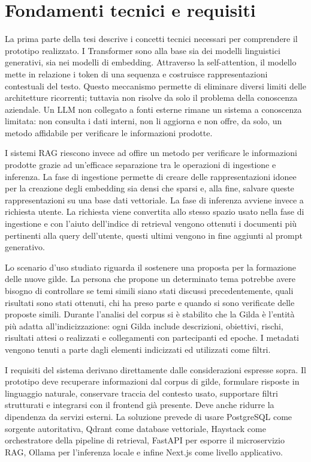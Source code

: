 \documentclass[12pt,a4paper]{article}
\begin{document}
\section*{Fondamenti tecnici e requisiti}

La prima parte della tesi descrive i concetti tecnici necessari per comprendere il
prototipo realizzato. I Transformer sono alla base sia dei modelli linguistici generativi,
sia nei modelli di embedding. Attraverso la self-attention, il modello mette in
relazione i token di una sequenza e costruisce rappresentazioni contestuali del
testo. Questo meccanismo permette di eliminare diversi limiti delle architetture ricorrenti;
tuttavia non risolve da solo il problema della conoscenza aziendale. Un LLM non
collegato a fonti esterne rimane un sistema a conoscenza limitata: non consulta i
dati interni, non li aggiorna e non offre, da solo, un metodo affidabile per verificare le informazioni prodotte.

I sistemi RAG riescono invece ad offire un metodo per verificare le informazioni prodotte
grazie ad un'efficace separazione tra le operazioni di ingestione e inferenza. 
La fase di ingestione permette di creare delle rappresentazioni idonee per la creazione 
degli embedding sia densi che sparsi e, alla fine, salvare queste rappresentazioni su una base 
dati vettoriale.
La fase di inferenza avviene invece a richiesta utente. La richiesta 
viene convertita allo stesso spazio usato nella fase di ingestione e con l'aiuto dell'indice di 
retrieval vengono ottenuti i documenti più pertinenti alla query dell'utente, questi ultimi vengono 
in fine aggiunti al prompt generativo.

Lo scenario d'uso studiato riguarda il sostenere una proposta per la formazione delle nuove gilde. 
La persona che propone un determinato tema potrebbe avere bisogno di controllare se temi simili 
siano stati discussi precedentemente, quali risultati sono stati ottenuti, chi ha preso parte e quando 
si sono verificate delle proposte simili. Durante l'analisi del corpus si è stabilito che la Gilda è 
l'entità più adatta all'indicizzazione: ogni Gilda include descrizioni, obiettivi, rischi, risultati 
attesi o realizzati e collegamenti con partecipanti ed epoche. I metadati vengono tenuti a parte dagli 
elementi indicizzati ed utilizzati come filtri.

I requisiti del sistema derivano direttamente dalle considerazioni espresse sopra. Il prototipo deve
recuperare informazioni dal corpus di gilde, formulare risposte in linguaggio
naturale, conservare traccia del contesto usato, supportare filtri strutturati
e integrarsi con il frontend già presente. Deve anche ridurre la
dipendenza da servizi esterni. La soluzione prevede di usare PostgreSQL come sorgente
autoritativa, Qdrant come database vettoriale, Haystack come orchestratore della
pipeline di retrieval, FastAPI per esporre il microservizio RAG, Ollama per
l'inferenza locale e infine Next.js come livello applicativo.
\end{document}
